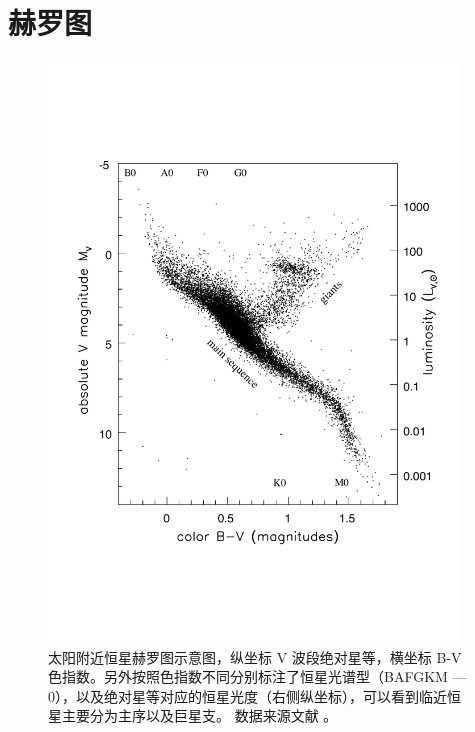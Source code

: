 \chapter{赫罗图} \label{apdx:HRdiagram}
\begin{figure}[ht!]
\centering
\includegraphics[width=0.97\textwidth]{figures/appendix/f4_HRdiagram.pdf}
\caption[赫罗图示意图，数据采自 ESA/Hipparcos/Tycho]{太阳附近恒星赫罗图示意图，纵坐标 V 波段绝对星等，横坐标 B-V 色指数。另外按照色指数不同分别标注了恒星光谱型（BAFGKM --- 0），以及绝对星等对应的恒星光度（右侧纵坐标），可以看到临近恒星主要分为主序以及巨星支。 数据来源文献 。}
\label{fig:hrdiagram}
\end{figure}


